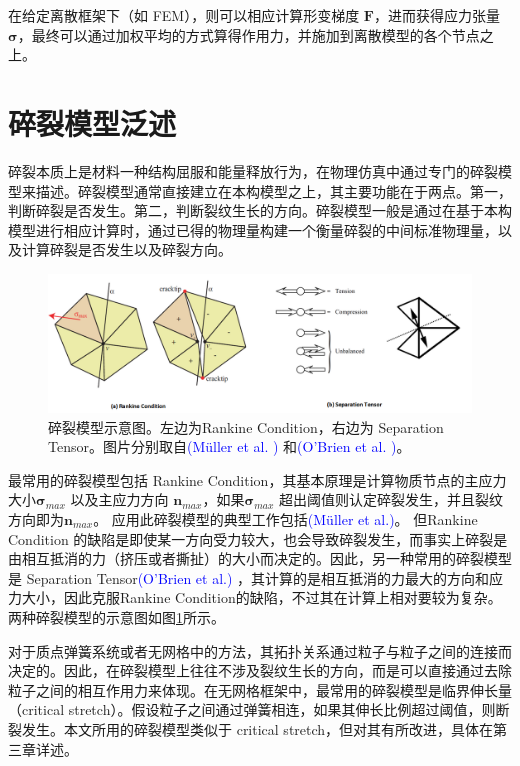 在给定离散框架下（如 FEM），则可以相应计算形变梯度 $\textbf{F}$，进而获得应力张量 $\mathbf{\sigma}$，最终可以通过加权平均的方式算得作用力，并施加到离散模型的各个节点之上。

\section{碎裂模型泛述}
\label{fracture_model}

碎裂本质上是材料一种结构屈服和能量释放行为，在物理仿真中通过专门的碎裂模型来描述。碎裂模型通常直接建立在本构模型之上，其主要功能在于两点。第一，判断碎裂是否发生。第二，判断裂纹生长的方向。碎裂模型一般是通过在基于本构模型进行相应计算时，通过已得的物理量构建一个衡量碎裂的中间标准物理量，以及计算碎裂是否发生以及碎裂方向。

\begin{figure}[!htb]
  \centering
  \captionsetup{justification=centering}
  \includegraphics[width=\linewidth]{chap/image/fracture_model}

  \caption{\label{fracture_model}
           碎裂模型示意图。左边为Rankine Condition，右边为 Separation Tensor。图片分别取自\textcolor{blue}{(M\"{u}ller et al. )\parencite{Muller2004}} 和\textcolor{blue}{(O'Brien et al. )\parencite{OBrien1999}}。
          }
\end{figure}

最常用的碎裂模型包括 Rankine Condition，其基本原理是计算物质节点的主应力大小$\mathbf{\sigma}_{max}$ 以及主应力方向 $\textbf{n}_{max}$，如果$\mathbf{\sigma}_{max}$ 超出阈值则认定碎裂发生，并且裂纹方向即为$\textbf{n}_{max}$。 应用此碎裂模型的典型工作包括\textcolor{blue}{(M\"{u}ller et al.)\parencite{Muller2004}}。 但Rankine Condition 的缺陷是即使某一方向受力较大，也会导致碎裂发生，而事实上碎裂是由相互抵消的力（挤压或者撕扯）的大小而决定的。因此，另一种常用的碎裂模型是 Separation Tensor\textcolor{blue}{(O'Brien et al.)\parencite{OBrien1999}} ，其计算的是相互抵消的力最大的方向和应力大小，因此克服Rankine Condition的缺陷，不过其在计算上相对要较为复杂。两种碎裂模型的示意图如图\ref{fracture_model}所示。

对于质点弹簧系统或者无网格中的方法，其拓扑关系通过粒子与粒子之间的连接而决定的。因此，在碎裂模型上往往不涉及裂纹生长的方向，而是可以直接通过去除粒子之间的相互作用力来体现。在无网格框架中，最常用的碎裂模型是临界伸长量（critical stretch）。假设粒子之间通过弹簧相连，如果其伸长比例超过阈值，则断裂发生。本文所用的碎裂模型类似于 critical stretch，但对其有所改进，具体在第三章详述。

